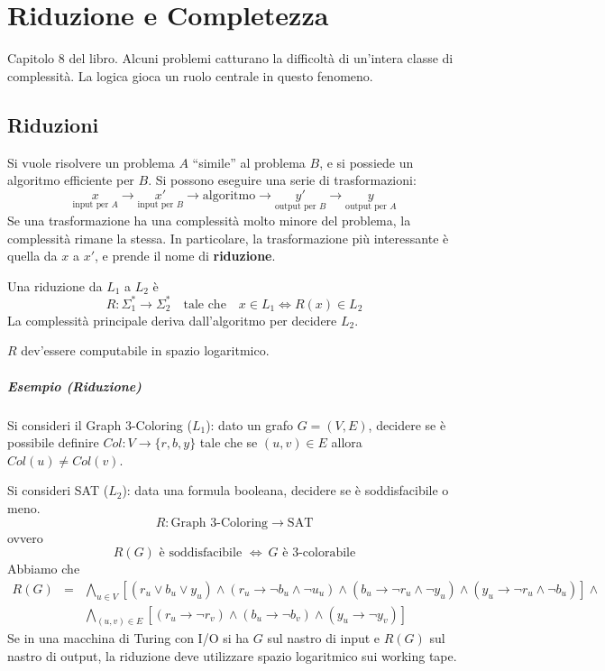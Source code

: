\chapter{Riduzione e Completezza}
Capitolo 8 del libro. Alcuni problemi catturano la difficoltà di un'intera classe di complessità. La logica gioca un ruolo centrale in questo fenomeno.


\section{Riduzioni}
Si vuole risolvere un problema $A$ ``simile'' al problema $B$, e si possiede un algoritmo efficiente per $B$. Si possono eseguire una serie di trasformazioni:
$$
    \underset{\text{input per }A}{x} \to \underset{\text{input per }B}{x'} \to \text{algoritmo} \to \underset{\text{output per }B}{y'} \to \underset{\text{output per }A}{y}
$$
Se una trasformazione ha una complessità molto minore del problema, la complessità rimane la stessa. In particolare, la trasformazione più interessante è quella da $x$ a $x'$, e prende il nome di \textbf{riduzione}.
\begin{definition}[Riduzione]
    Una riduzione da $L_1$ a $L_2$ è
    $$
        R:\Sigma_1^*\to\Sigma_2^* \text{ ~ tale che ~ } x\in L_1 \Leftrightarrow R(x)\in L_2
    $$
    La complessità principale deriva dall'algoritmo per decidere $L_2$.
\end{definition}
$R$ dev'essere computabile in spazio logaritmico.

\paragraph{Esempio (Riduzione)} Si consideri il Graph 3-Coloring ($L_1$): dato un grafo $G=(V,E)$, decidere se è possibile definire $Col:V\to\{r,b,y\}$ tale che se $(u,v)\in E$ allora $Col(u)\neq Col(v)$.

Si consideri SAT ($L_2$): data una formula booleana, decidere se è soddisfacibile o meno. 
$$
    R:\text{Graph 3-Coloring}\to\text{SAT}
$$
ovvero
$$
    R(G) \text{ è soddisfacibile } \Leftrightarrow~ G \text{ è 3-colorabile}
$$
Abbiamo che 
\begin{eqnarray*}
    R(G) &=& \bigwedge_{u\in V} [(r_u\lor b_u\lor y_u) \land 
    (r_u\to \lnot b_u\land \lnot u_u) \land
    (b_u\to \lnot r_u\land \lnot y_u) \land
    (y_u\to \lnot r_u\land \lnot b_u)] \land\\
    & & \bigwedge_{(u,v)\in E} [(r_u\to \lnot r_v) \land (b_u\to \lnot b_v) \land (y_u\to \lnot y_v)]
\end{eqnarray*}
Se in una macchina di Turing con I/O si ha $G$ sul nastro di input e $R(G)$ sul nastro di output, la riduzione deve utilizzare spazio logaritmico sui working tape.

